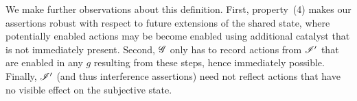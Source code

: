 We make further observations about this definition. First, property~(4) makes our assertions robust with respect to future extensions of the shared state, where potentially enabled actions may be become enabled using additional catalyst that is not immediately present. Second, $\mathscr{G}$ only has to record actions from $\mathscr{I}'$ that are enabled in any $g$ resulting from these steps, hence immediately possible. Finally, $\mathscr{I}'$ (and thus interference assertions) need not reflect actions that have no visible effect on the subjective
state.


	
